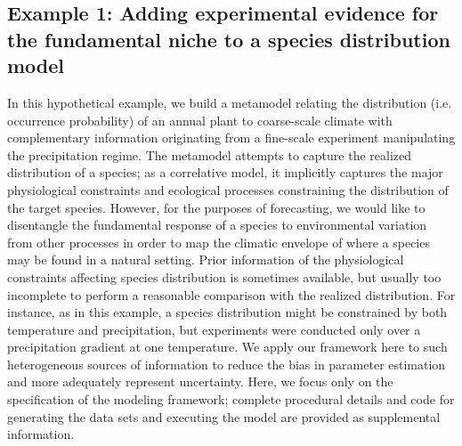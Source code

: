 \subsection*{Example 1: Adding experimental evidence for the fundamental niche to a species distribution model} 

In this hypothetical example, we build a metamodel relating the distribution (i.e. occurrence probability) of an annual plant to coarse-scale climate with complementary information originating from a fine-scale experiment manipulating the precipitation regime.
The metamodel attempts to capture the realized distribution of a species; as a correlative model, it implicitly captures the major physiological constraints and ecological processes constraining the distribution of the target species. 
However, for the purposes of forecasting, we would like to disentangle the fundamental response of a species to environmental variation from other processes in order to map the climatic envelope of where a species may be found in a natural setting. 
Prior information of the physiological constraints affecting species distribution is sometimes available, but usually too incomplete to perform a reasonable comparison with the realized distribution.
For instance, as in this example, a species distribution might be constrained by both temperature and precipitation, but experiments were conducted only over a precipitation gradient at one temperature. 
We apply our framework here to such heterogeneous sources of information to reduce the bias in parameter estimation and more adequately represent uncertainty. 
Here, we focus only on the specification of the modeling framework; complete procedural details and code for generating the data sets and executing the model are provided as supplemental information.

